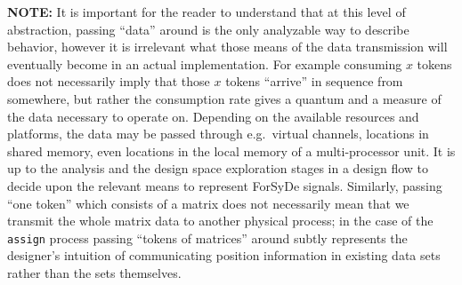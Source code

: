 \documentclass[
  a4paper,
]{article}
\begin{document}
\textbf{NOTE:} It is important for the reader to understand that at this
level of abstraction, passing ``data'' around is the only analyzable way
to describe behavior, however it is irrelevant what those means of the
data transmission will eventually become in an actual implementation.
For example consuming \(x\) tokens does not necessarily imply that those
\(x\) tokens ``arrive'' in sequence from somewhere, but rather the
consumption rate gives a quantum and a measure of the data necessary to
operate on. Depending on the available resources and platforms, the data
may be passed through e.g.~virtual channels, locations in shared memory,
even locations in the local memory of a multi-processor unit. It is up
to the analysis and the design space exploration stages in a design flow
to decide upon the relevant means to represent ForSyDe signals.
Similarly, passing ``one token'' which consists of a matrix does not
necessarily mean that we transmit the whole matrix data to another
physical process; in the case of the \texttt{assign} process passing
``tokens of matrices'' around subtly represents the designer's intuition
of communicating position information in existing data sets rather than
the sets themselves.
\end{document}
